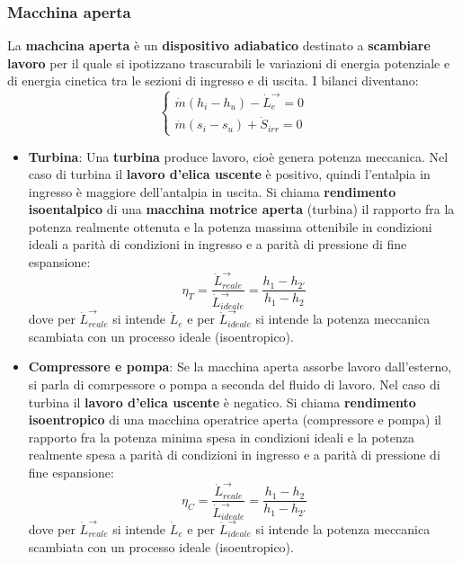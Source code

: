 \subsubsection{Macchina aperta}
La \textbf{machcina aperta} è un \textbf{dispositivo adiabatico} destinato a \textbf{scambiare lavoro} per il quale si ipotizzano trascurabili le variazioni di energia potenziale e di energia cinetica tra le sezioni di ingresso e di uscita.\newline
\newline
I bilanci diventano:
\[
    \begin{cases}
        \dot{m} (h_i - h_u) - \dot{L}_e^\rightarrow  = 0\\
        \dot{m} (s_i-s_u) + \dot{S}_{irr} = 0
    \end{cases}
\]
\begin{itemize}
    \item \textbf{Turbina}:\newline
    Una \textbf{turbina} produce lavoro, cioè genera potenza meccanica.\newline
    \newline
    Nel caso di turbina il \textbf{lavoro d'elica uscente} è positivo, quindi l'entalpia in ingresso è maggiore dell'antalpia in uscita.\newline
    \newline
    Si chiama \textbf{rendimento isoentalpico} di una \textbf{macchina motrice aperta} (turbina) il rapporto fra la potenza realmente ottenuta e la potenza massima ottenibile in condizioni ideali a parità di condizioni in ingresso e a parità di pressione di fine espansione:
    \[
        \eta_T = \frac{\dot{L}_{reale}^\rightarrow }{\dot{L}_{ideale}^\rightarrow } = \frac{h_1 - h_{2'}}{h_1-h_2}
    \]
    dove per $\dot{L}_{reale}^\rightarrow $ si intende $\dot{L}_e$ e per $\dot{L}_{ideale}^\rightarrow $ si intende la potenza meccanica scambiata con un processo ideale (isoentropico).
    \item \textbf{Compressore e pompa}:\newline
    Se la macchina aperta assorbe lavoro dall'esterno, si parla di comrpessore o pompa a seconda del fluido di lavoro.\newline
    \newline
    Nel caso di turbina il \textbf{lavoro d'elica uscente} è negatico.\newline
    \newline
    Si chiama \textbf{rendimento isoentropico} di una macchina operatrice aperta (compressore e pompa) il rapporto fra la potenza minima spesa in condizioni ideali e la potenza realmente spesa a parità di condizioni in ingresso e a parità di pressione di fine espansione:
    \[
        \eta_C = \frac{\dot{L}_{reale}^\rightarrow }{\dot{L}_{ideale}^\rightarrow } = \frac{h_1-h_2}{h_1-h_{2'}} 
    \]
    dove per $\dot{L}_{reale}^\rightarrow $ si intende $\dot{L}_e$ e per $\dot{L}_{ideale}^\rightarrow $ si intende la potenza meccanica scambiata con un processo ideale (isoentropico).
\end{itemize}
